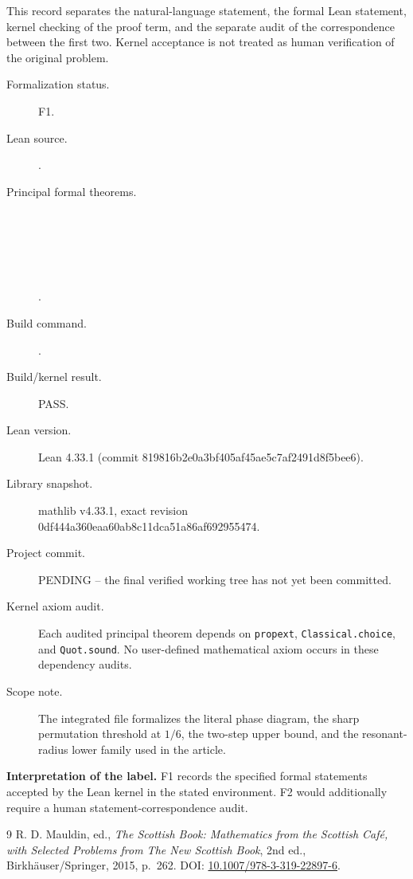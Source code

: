 \documentclass[11pt]{article}
\begin{document}
\begingroup\small\sloppy
This record separates the natural-language statement, the formal Lean statement, kernel checking of the proof term, and the separate audit of the correspondence between the first two. Kernel acceptance is not treated as human verification of the original problem.

\begin{description}
\item[Formalization status.] F1.
\item[Lean source.] \texttt{}.
\item[Principal formal theorems.] \mbox{}\\
\texttt{}\\
\texttt{}\\
\texttt{}\\
\texttt{}\\
\texttt{}.
\item[Build command.] \texttt{}.
\item[Build/kernel result.] PASS.
\item[Lean version.] Lean 4.33.1 (commit 819816b2e0a3bf405af45ae5c7af2491d8f5bee6).
\item[Library snapshot.] mathlib v4.33.1, exact revision 0df444a360eaa60ab8c11dca51a86af692955474.
\item[Project commit.] PENDING -- the final verified working tree has not yet been committed.
\item[Kernel axiom audit.] Each audited principal theorem depends on \texttt{propext}, \texttt{Classical.choice}, and \texttt{Quot.sound}. No user-defined mathematical axiom occurs in these dependency audits.
\item[Scope note.] The integrated file formalizes the literal phase diagram, the sharp permutation threshold at $1/6$, the two-step upper bound, and the resonant-radius lower family used in the article.
\end{description}

\noindent\textbf{Interpretation of the label.} F1 records the specified formal statements accepted by the Lean kernel in the stated environment. F2 would additionally require a human statement-correspondence audit.
\endgroup

\begin{thebibliography}{9}
R. D. Mauldin, ed.,
\emph{The Scottish Book: Mathematics from the Scottish Caf\'e, with Selected Problems from The New Scottish Book},
2nd ed., Birkh\"auser/Springer, 2015, p.~262.
\newblock DOI: \href{https://doi.org/10.1007/978-3-319-22897-6}{10.1007/978-3-319-22897-6}.
\end{thebibliography}
\end{document}
